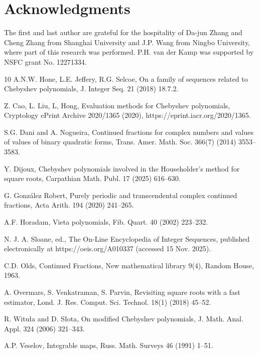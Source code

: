 \documentclass[a4paper,fleqn]{cas-sc}
\begin{document}
\appendix
\section*{Acknowledgments}
The first and last author are grateful for the hospitality of Da-jun Zhang and Cheng Zhang from Shanghai University and J.P. Wang from Ningbo University, where part of this research was performed. P.H. van der Kamp was supported by NSFC grant No. 12271334. 

\begin{thebibliography}{10}
A.N.W. Hone, L.E. Jeffery, R.G. Selcoe,
On a family of sequences related to Chebyshev polynomials,
J. Integer Seq. 21 (2018) 18.7.2.

Z. Cao, L. Liu, L, Hong,
Evaluation methods for Chebyshev polynomials,
Cryptology {ePrint} Archive 2020/1365
(2020), https://eprint.iacr.org/2020/1365.

S.G. Dani and A. Nogueira, Continued fractions for complex numbers
and values of values of binary quadratic forms, Trans. Amer. Math. Soc. 366(7) (2014) 3553--3583.

Y. Dijoux, Chebyshev polynomials involved in the Householder’s method for square roots, Carpathian Math. Publ. 17 (2025) 616--630.

G. Gonz\'alez Robert, Purely periodic and transcendental complex continued fractions,
Acta Arith. 194 (2020) 241--265.

A.F. Horadam, Vieta polynomials, Fib. Quart. 40 (2002) 223--232.

N. J. A. Sloane, ed., The On-Line Encyclopedia of Integer Sequences, published electronically at https://oeis.org/A010337 (accessed 15 Nov. 2025).

C.D. Olds, Continued Fractions, New mathematical library 9(4), Random House, 1963.

A. Overmars, S. Venkatraman, S. Parvin, Revisiting square roots with a fast estimator, Lond. J. Res. Comput. Sci. Technol. 18(1) (2018) 45--52.

R. Witu\l a and D. S\l ota, On modified Chebyshev polynomials, J. Math. Anal. Appl. 324 (2006) 321--343.

A.P. Veselov, Integrable maps, Russ. Math. Surveys 46 (1991) 1--51.
\end{thebibliography}
\end{document}
